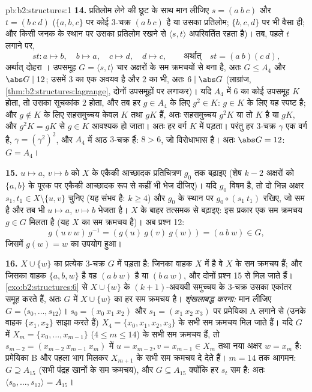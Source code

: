 \begin{solution}{pb:b2:structures:1}
\textbf{14.} प्रतिलोम लेने की छूट के साथ मान लीजिए $s = (a\ b\ c)$ और $t =
(b\ c\ d)$ ($\{a,b,c\}$ पर
कोई $3$-चक्र $(a\ b\ c)$ है या उसका प्रतिलोम; $\{b,c,d\}$ पर भी वैसा ही; और किसी जनक
के स्थान पर उसका प्रतिलोम रखने से $\langle s, t\rangle$ अपरिवर्तित रहता है)। तब, पहले
$t$ लगाने पर,
\[
st \colon a \mapsto b,\quad b \mapsto a,\quad c \mapsto d,\quad
d \mapsto c, \qquad\text{अर्थात्}\quad st = (a\ b)(c\ d),
\]
अर्थात् दोहरा । उपसमूह $G = \langle s, t\rangle$ चार अक्षरों के सम क्रमचयों से बना
है, अतः $G \leq
A_4$ और $\abs G \mid 12$; उसमें  $3$ का एक अवयव है और  $2$ का
भी, अतः $6 \mid \abs G$ (लाग्रांज, \cref{thm:b2:structures:lagrange}, दोनों  उपसमूहों पर लगाकर)। यदि
$A_4$ में  $6$ का कोई उपसमूह $K$ होता, तो उसका सूचकांक $2$
होता, और तब हर $g \in A_4$ के लिए $g^2 \in K$: $g \in K$ के लिए यह स्पष्ट है; और $g \notin K$
के लिए सहसमुच्चय केवल $K$ तथा $gK$ हैं, अतः सहसमुच्चय $g^2K$ या तो
$K$ है या $gK$, और $g^2K =
gK$ से $g \in K$ आवश्यक हो जाता। अतः हर वर्ग $K$ में
पड़ता। परंतु हर $3$-चक्र $\gamma$ एक वर्ग है, $\gamma = (\gamma^2)^2$, और $A_4$ में आठ
$3$-चक्र हैं: $8 > 6$, जो विरोधाभास है। अतः $\abs G = 12$: $G = A_4$।

\textbf{15.} $u \mapsto a$, $v \mapsto b$ को $X$ के एकैकी आच्छादक प्रतिचित्रण $g_0$ तक
बढ़ाइए (शेष $k - 2$ अक्षरों को $\{a, b\}$ के पूरक पर एकैकी आच्छादक रूप से कहीं
भी भेज दीजिए)। यदि $g_0$ विषम है, तो दो भिन्न अक्षर $s_1, t_1 \in X \setminus \{u, v\}$ चुनिए (यह संभव
है: $k \geq 4$) और $g_0$ के स्थान पर $g_0 \circ (s_1\
t_1)$ रखिए, जो सम है और तब भी $u \mapsto a$, $v \mapsto
b$
भेजता है। $X$ के बाहर तत्समक से बढ़ाइए: इस प्रकार एक सम क्रमचय $g \in
G$
मिलता है (यह $X$ का सम क्रमचय है)। अब प्रश्न 12:
\[
g\,(u\ v\ w)\,g^{-1} = (g(u)\ g(v)\ g(w)) = (a\ b\ w) \in G,
\]
जिसमें $g(w) = w$ का उपयोग हुआ।

\textbf{16.} $X \cup \{w\}$ का प्रत्येक $3$-चक्र $G$ में पड़ता है: जिनका वाहक
$X$ में है वे $X$ के सम क्रमचय हैं; और जिसका वाहक $\{a, b, w\}$ है वह $(a\ b\ w)$ है या
$(b\ a\ w)$, और दोनों प्रश्न 15 से मिल जाते हैं। \cref{exo:b2:structures:6} से $X \cup \{w\}$ के $(k+1)$-अवयवी
समुच्चय के $3$-चक्र उसका एकांतर समूह \omterm{def:b2:structures:generated}{जनित} करते हैं, अतः $G$ में $X \cup \{w\}$
का हर सम क्रमचय है। \emph{शृंखलाबद्ध करना:} मान लीजिए $G = \langle s_0, \dots,
s_{12}\rangle$। $s_0 = (x_0\ x_1\ x_2)$ और
$s_1 = (x_1\ x_2\ x_3)$ पर प्रमेयिका A लगाने से (उनके वाहक $\{x_1, x_2\}$ साझा करते हैं) $X_4 = \{x_0, x_1, x_2, x_3\}$ के
सभी सम क्रमचय मिल जाते हैं। यदि $G$ में $X_m = \{x_0, \dots,
x_{m-1}\}$ ($4 \leq m \leq 14$) के सभी सम क्रमचय
हैं, तो $s_{m-2} = (x_{m-2}\
x_{m-1}\ x_m)$ में $u = x_{m-2}, v = x_{m-1} \in X_m$ तथा नया अक्षर $w = x_m$ है: प्रमेयिका B और पहला भाग
मिलकर $X_{m+1}$ के सभी सम क्रमचय दे देते हैं। $m = 14$ तक आगमन: $G \supseteq
A_{15}$ (सभी
पंद्रह खानों के सम क्रमचय), और $G
\subseteq A_{15}$ क्योंकि हर $s_t$ सम है: अतः $\langle s_0, \dots,
s_{12}\rangle = A_{15}$।


\end{solution}
